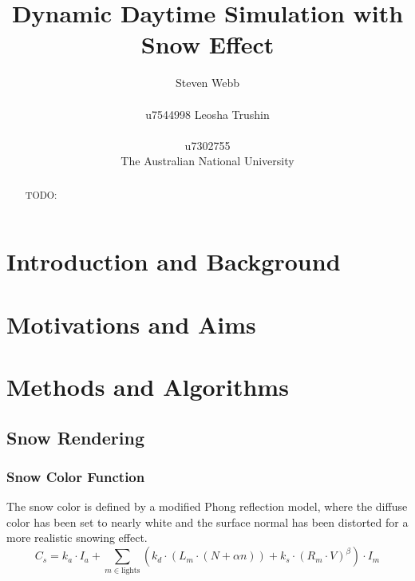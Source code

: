 \documentclass{article}
\title{Dynamic Daytime Simulation with Snow Effect}
\author{%
  Steven Webb\\\\
  u7544998 
   \And
  Leosha Trushin\\\\
  u7302755\\
  \AND  The Australian National University 
}
\begin{document}
\maketitle

\begin{abstract}
TODO:
\end{abstract}

\section{Introduction and Background}

\section{Motivations and Aims}

\section {Methods and Algorithms}

\subsection {Snow Rendering}

\subsubsection {Snow Color Function}
The snow color is defined by a modified Phong reflection model, where the diffuse color has been set to nearly white and the surface 
normal has been distorted for a more realistic snowing effect.
\[
  C_{s} = k_a \cdot I_a + \sum_{m \in \text{lights}} (k_d \cdot (L_m \cdot (N + \alpha n)) + k_s \cdot (R_m \cdot V)^\beta) \cdot I_m  
\]
\end{document}
